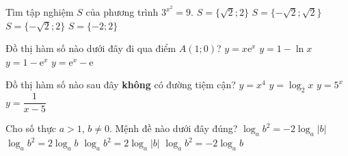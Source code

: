 \begin{ex}%
Tìm tập nghiệm $S$ của phương trình $3^{x^2}=9$.
\choice
{$S=\{\sqrt{2}; 2\}$}
{\True $S=\{-\sqrt{2}; \sqrt{2}\}$}
{$S=\{-\sqrt{2}; 2\}$}
{$S=\{-2; 2\}$}
\end{ex}

\begin{ex}%
Đồ thị hàm số nào dưới đây đi qua điểm $A(1; 0)$?
\choice
{$y=x\mathrm{e}^x$}
{$y=1-\ln x$}
{$y=1-\mathrm{e}^x$}
{\True $y=\mathrm{e}^x-\mathrm{e}$}
\end{ex}

\begin{ex}%
Đồ thị hàm số nào sau đây \textbf{không} có đường tiệm cận?
\choice
{\True $y=x^4$}
{$y=\log_2x$}
{$y=5^x$}
{$y=\dfrac{1}{x-5}$}
\end{ex}

\begin{ex}%
Cho số thực $a>1$, $b\neq 0$. Mệnh đề nào dưới đây đúng?
\choice
{$\log_ab^2=-2\log_a|b|$}
{$\log_ab^2=2\log_ab$}
{\True $\log_ab^2=2\log_a|b|$}
{$\log_ab^2=-2\log_ab$}
\end{ex}

